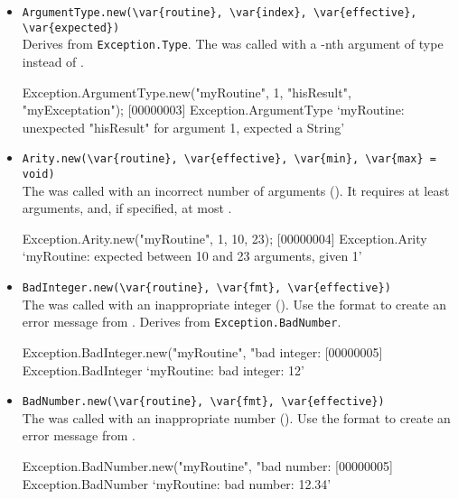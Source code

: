 \begin{itemize}
\item \lstinline|ArgumentType.new(\var{routine}, \var{index}, \var{effective}, \var{expected})|\\
  Derives from \lstinline|Exception.Type|.  The  was
  called with a -nth argument of type 
  instead of .
\begin{urbiscript}
Exception.ArgumentType.new("myRoutine", 1, "hisResult", "myExceptation");
[00000003] Exception.ArgumentType `myRoutine: unexpected "hisResult" for argument 1, expected a String'
\end{urbiscript}

\item \lstinline|Arity.new(\var{routine}, \var{effective}, \var{min}, \var{max} = void)|\\
  The  was called with an incorrect number of arguments
  ().  It requires at least  arguments, and,
  if specified, at most .
\begin{urbiscript}
Exception.Arity.new("myRoutine", 1, 10, 23);
[00000004] Exception.Arity `myRoutine: expected between 10 and 23 arguments, given 1'
\end{urbiscript}

\item \lstinline|BadInteger.new(\var{routine}, \var{fmt}, \var{effective})|\\
  The  was called with an inappropriate integer
  ().  Use the format  to create an error
  message from .  Derives from
  \lstinline|Exception.BadNumber|.
\begin{urbiscript}
Exception.BadInteger.new("myRoutine", "bad integer: %
[00000005] Exception.BadInteger `myRoutine: bad integer: 12'
\end{urbiscript}

\item \lstinline|BadNumber.new(\var{routine}, \var{fmt}, \var{effective})|\\
  The  was called with an inappropriate number
  ().  Use the format  to create an error
  message from .
\begin{urbiscript}
Exception.BadNumber.new("myRoutine", "bad number: %
[00000005] Exception.BadNumber `myRoutine: bad number: 12.34'
\end{urbiscript}


\end{itemize}
